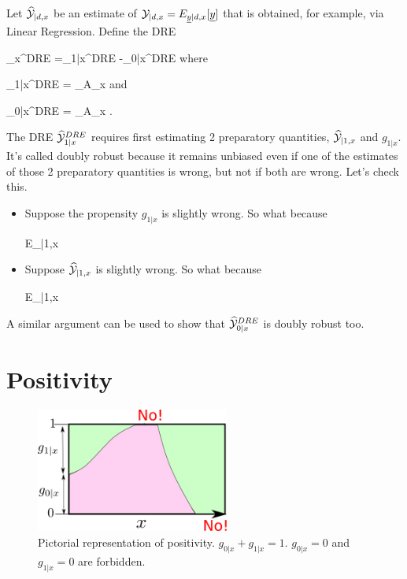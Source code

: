 Let
${\widehat{{\cal Y}}}_{|d, x}$
be an estimate
of $\caly_{|d, x}
=E_{\rvy|d,x}[\rvy]$
that is
obtained, for
example, via Linear Regression.
Define the DRE

\beq
{}_x^{DRE}
=\HAT{\caly}_{1|x}^{DRE}
-\HAT{\caly}_{0|x}^{DRE}
\eeq
where

\beq
\HAT{\caly}_{1|x}^{DRE}
=
\sum_{\s\in A_x}
\eeq
and

\beq
\HAT{\caly}_{0|x}^{DRE}
=
\sum_{\s\in A_x}
\;.
\eeq

The DRE
${\widehat{{\cal Y}}}_{1|x}^{DRE}$
requires first
estimating
2 preparatory quantities,
 ${\widehat{{\cal Y}}}_{|1, x}$
and $g_{1|x}$.
It's
called doubly robust
because it
remains unbiased
even if one
of the
estimates
of those 2
preparatory quantities is wrong,
but not if
both are wrong.
Let's check this.

\begin{itemize}
\item Suppose the propensity
$g_{1|x}$ is slightly wrong.
So what because


\beq
E_{\s|1,x}
\eeq

\item Suppose
${\widehat{{\cal Y}}}_{|1, x}$ is
slightly wrong. So what because

\beq
E_{\s|1,x}
\eeq

\end{itemize}A similar argument
can be used
to show that
${\widehat{{\cal Y}}}_{0|x}^{DRE}$
is doubly robust too.


\section{Positivity}

\begin{figure}[h!]
\centering
\includegraphics[width=2.5in]
{pot-out/po-positivity}
\caption{Pictorial
representation of positivity.
$g_{0|x}+g_{1|x}=1$.
$g_{0|x}=0$
and
$g_{1|x}=0$ are forbidden.}
\label{fig-po-positivity}
\end{figure}



